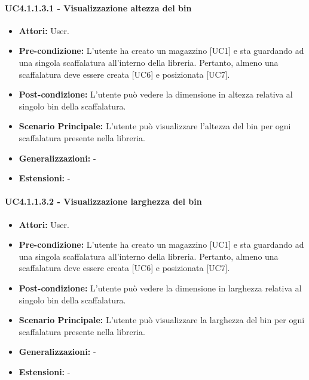 \paragraph{UC4.1.1.3.1 - Visualizzazione altezza del bin}
\begin{itemize}
    \item \textbf{Attori:} User.
    \item \textbf{Pre-condizione:} L'utente ha creato un magazzino [UC1] e sta guardando ad una singola scaffalatura all'interno della libreria. Pertanto, almeno una scaffalatura deve essere creata [UC6] e posizionata [UC7].
    \item \textbf{Post-condizione:} L'utente può vedere la dimensione in altezza relativa al singolo bin della scaffalatura.
    \item \textbf{Scenario Principale:} L'utente può visualizzare l'altezza del bin per ogni scaffalatura presente nella libreria.
    \item \textbf{Generalizzazioni:} -
    \item \textbf{Estensioni:} -
\end{itemize}


\paragraph{UC4.1.1.3.2 - Visualizzazione larghezza del bin}
\begin{itemize}
    \item \textbf{Attori:} User.
    \item \textbf{Pre-condizione:} L'utente ha creato un magazzino [UC1] e sta guardando ad una singola scaffalatura all'interno della libreria. Pertanto, almeno una scaffalatura deve essere creata [UC6] e posizionata [UC7].
    \item \textbf{Post-condizione:} L'utente può vedere la dimensione in larghezza relativa al singolo bin della scaffalatura.
    \item \textbf{Scenario Principale:}  L'utente può visualizzare la larghezza del bin per ogni scaffalatura presente nella libreria.
    \item \textbf{Generalizzazioni:} -
    \item \textbf{Estensioni:} -
\end{itemize}

